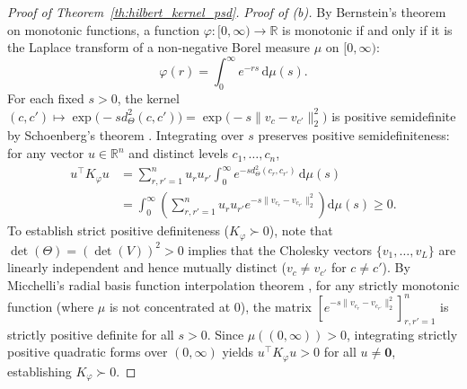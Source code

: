 \documentclass[default,sn-mathphys,Numbered]{sn-jnl}
\theoremstyle{thmstyleone}
\theoremstyle{thmstylethree}
\theoremstyle{thmstyletwo}
\begin{document}
\begin{appendices}
\begin{proof}[Proof of Theorem~\ref{th:hilbert_kernel_psd}]
\textit{Proof of (b).} By Bernstein's theorem on  monotonic functions, a function $\varphi : [0, \infty) \to \mathbb{R}$ is  monotonic if and only if it is the Laplace transform of a non-negative Borel measure $\mu$ on $[0, \infty)$:
\begin{equation}
\varphi(r) = \int_0^\infty e^{-r s} \, \mathrm{d}\mu(s).
\end{equation}
For each fixed $s > 0$, the kernel $(c, c') \mapsto \exp\bigl(-s d_\Theta^2(c, c')\bigr) = \exp\bigl(-s \|v_c - v_{c'}\|_2^2\bigr)$ is positive semidefinite by Schoenberg's theorem \citep{schoenberg1938metric}.
Integrating over $s$ preserves positive semidefiniteness: for any vector $u \in \mathbb{R}^n$ and distinct levels $c_1, \dots, c_n$,
\begin{equation}
\begin{split}
u^\top K_\varphi u &= \sum_{r, r'=1}^n u_r u_{r'} \int_0^\infty e^{-s d_\Theta^2(c_r, c_{r'})} \, \mathrm{d}\mu(s) \\
&= \int_0^\infty \left( \sum_{r, r'=1}^n u_r u_{r'} e^{-s \|v_{c_r} - v_{c_{r'}}\|_2^2} \right) \mathrm{d}\mu(s) \ge 0.
\end{split}
\end{equation}
To establish strict positive definiteness ($K_\varphi \succ 0$), note that $\det(\Theta) = (\det(V))^2 > 0$ implies that the Cholesky vectors $\{v_1, \dots, v_L\}$ are linearly independent and hence mutually distinct ($v_c \neq v_{c'}$ for $c \neq c'$).
By Micchelli's radial basis function interpolation theorem \citep{micchelli1986interpolation}, for any strictly  monotonic function (where $\mu$ is not concentrated at $0$), the matrix $[e^{-s \|v_{c_r} - v_{c_{r'}}\|_2^2}]_{r, r'=1}^n$ is strictly positive definite for all $s > 0$.
Since $\mu((0, \infty)) > 0$, integrating strictly positive quadratic forms over $(0, \infty)$ yields $u^\top K_\varphi u > 0$ for all $u \neq \bm{0}$, establishing $K_\varphi \succ 0$.


\end{proof}
\end{appendices}
\end{document}
